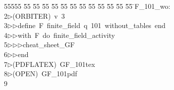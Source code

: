 %
%
\begin{tabbing}
55555 \= 55 \= 55 \= 55 \= 55 \= 55 \= 55 \= 55 \= 55 \= 55 \= 55 \= 55 \= 55 \= \>F\_101\_wo:\\[0pt]
2\>$\triangleright$\>(ORBITER)\ v\ 3\ \\[0pt]
3\>$\triangleright$\>$\triangleright$\>define\ F\ finite\_field\ q\ 101\ without\_tables\ end\ \\[0pt]
4\>$\triangleright$\>$\triangleright$\>with\ F\ do\ finite\_field\_activity\ \\[0pt]
5\>$\triangleright$\>$\triangleright$\>$\triangleright$\>cheat\_sheet\_GF\ \\[0pt]
6\>$\triangleright$\>$\triangleright$\>end\\[0pt]
7\>$\triangleright$\>(PDFLATEX)\ GF\_101tex\\[0pt]
8\>$\triangleright$\>(OPEN)\ GF\_101pdf\\[0pt]
9\>\end{tabbing}
